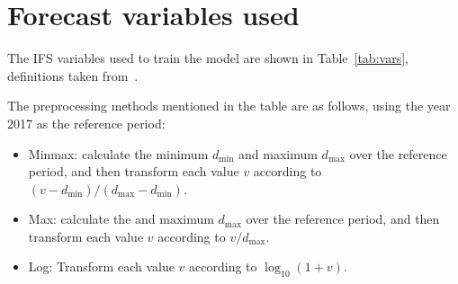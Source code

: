 \documentclass{article}
\begin{document}


\appendix

\section{Forecast variables used}\label{app:fcst_vars}
The IFS variables used to train the model are shown in Table~\ref{tab:vars}, definitions taken from~\citep{ecmwf_parameter_2023}.

The preprocessing methods mentioned in the table are as follows, using the year 2017 as the reference period:
\begin{itemize}
    \item Minmax: calculate the minimum $d_{\text{min}}$ and maximum $d_{\text{max}}$ over the reference period, and then transform each value $v$ according to $(v - d_{\text{min}}) / (d_{\text{max}} - d_{\text{min}})$.
    \item Max: calculate the and maximum $d_{\text{max}}$ over the reference period, and then transform each value $v$ according to $v  / d_{\text{max}}$.
    \item Log: Transform each value $v$ according to $\log_{10}(1+v)$.
\end{itemize}
\end{document}
